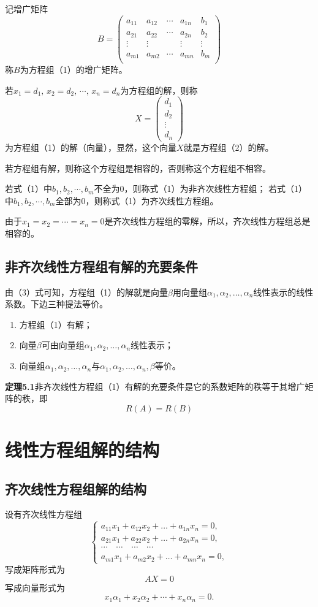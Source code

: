 \documentclass{article}
\begin{document}
记增广矩阵
\[
B=
\left(\begin{array}{cccc|c}
a_{11} & a_{12} & \cdots & a_{1n} & b_1 \\
a_{21} & a_{22} & \cdots & a_{2n} & b_2 \\
\vdots & \vdots & &\vdots & \vdots \\
a_{m1} & a_{m2} & \cdots & a_{mn} & b_m \\
\end{array}\right)
\]
称$B$为方程组（1）的增广矩阵。

若$x_1=d_1,\,x_2=d_2,\,\cdots,\,x_n=d_n$为方程组的解，则称
\[
X=\begin{pmatrix}d_1\\d_2\\\vdots\\d_n\end{pmatrix}
\]
为方程组（1）的解（向量），显然，这个向量$X$就是方程组（2）的解。

若方程组有解，则称这个方程组是相容的，否则称这个方程组不相容。

若式（1）中$b_1,b_2,\cdots,b_m$不全为$0$，则称式（1）为非齐次线性方程组；
若式（1）中$b_1,b_2,\cdots,b_m$全部为$0$，则称式（1）为齐次线性方程组。

由于$x_1=x_2=\cdots=x_n=0$是齐次线性方程组的零解，所以，齐次线性方程组总是相容的。

\subsection{非齐次线性方程组有解的充要条件}
由（3）式可知，方程组（1）的解就是向量$\beta$用向量组$\alpha_1,\alpha_2,\dots,\alpha_n$线性表示的线性系数。下边三种提法等价。
\begin{enumerate}
    \item 方程组（1）有解；
    \item 向量$\beta$可由向量组$\alpha_1,\alpha_2,\dots,\alpha_n$线性表示；
    \item 向量组$\alpha_1,\alpha_2,\dots,\alpha_n$与$\alpha_1,\alpha_2,\dots,\alpha_n,\beta$等价。
\end{enumerate}

\textbf{定理5.1}\quad 非齐次线性方程组（1）有解的充要条件是它的系数矩阵的秩等于其增广矩阵的秩，即
\[
R(A)=R(B)
\]

\section{线性方程组解的结构}
\subsection{齐次线性方程组解的结构}
设有齐次线性方程组
\[
\begin{cases}
a_{11}x_1+a_{12}x_2+\dots+a_{1n}x_n=0,\\
a_{21}x_1+a_{22}x_2+\dots+a_{2n}x_n=0,\\
\cdots\quad\cdots\quad\cdots\quad\cdots\\
a_{m1}x_1+a_{m2}x_2+\dots+a_{mn}x_n=0,
\end{cases} \tag{4}
\]
写成矩阵形式为
\[
AX=0 \tag{5}
\]
写成向量形式为
\[
x_1\alpha_1+x_2\alpha_2+\cdots+x_n\alpha_n=0. \tag{6}
\]
\end{document}
